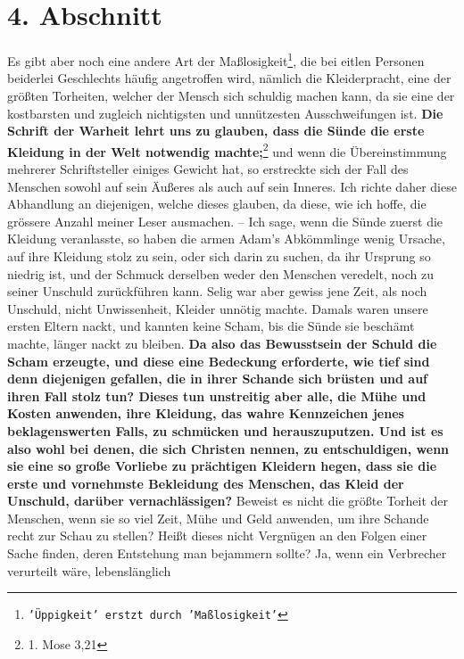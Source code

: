 \section{4. Abschnitt} \label{kap14_ab4}

Es gibt aber noch eine andere Art der Maßlosigkeit\footnote{\texttt{'Üppigkeit'
erstzt
durch 'Maßlosigkeit'}}, die bei eitlen Personen beiderlei
Geschlechts häufig angetroffen wird, nämlich die Kleiderpracht,
eine der
größten Torheiten, welcher der Mensch sich schuldig machen kann, da sie eine
der kostbarsten und zugleich nichtigsten und unnützesten Ausschweifungen ist.
\textbf{Die
Schrift der Warheit lehrt uns zu glauben, dass die Sünde die erste Kleidung in
der
Welt notwendig machte;}\footnote{1. Mose 3,21}
und wenn die Übereinstimmung
mehrerer Schriftsteller einiges Gewicht hat, so erstreckte sich der Fall des
Menschen sowohl auf sein Äußeres als auch auf sein Inneres. Ich richte daher
diese
Abhandlung an diejenigen, welche dieses glauben, da diese, wie ich hoffe, die
grössere Anzahl meiner Leser ausmachen. -- Ich sage, wenn die Sünde zuerst die
Kleidung veranlasste, so haben die armen Adam’s
Abkömmlinge wenig Ursache, auf
ihre Kleidung stolz zu sein, oder sich darin zu suchen, da ihr Ursprung so
niedrig ist, und der Schmuck derselben weder den Menschen veredelt, noch zu
seiner Unschuld zurückführen kann. Selig war aber gewiss jene Zeit, als noch
Unschuld, nicht Unwissenheit, Kleider unnötig machte. Damals waren unsere ersten
Eltern nackt, und kannten keine Scham, bis die Sünde sie beschämt
machte,
länger nackt zu bleiben. \label{ref:14_04_wahre_nachfolger_kleidung}
\textbf{Da also das Bewusstsein der Schuld die Scham erzeugte,
und diese eine Bedeckung erforderte, wie tief sind denn diejenigen gefallen, die
in ihrer Schande sich brüsten und auf ihren Fall stolz tun? Dieses tun
unstreitig aber alle, die Mühe und Kosten anwenden, ihre Kleidung, das wahre
Kennzeichen jenes beklagenswerten Falls, zu schmücken und herauszuputzen. Und
ist es also wohl bei denen, die sich Christen nennen, zu entschuldigen, wenn sie
eine so große Vorliebe zu prächtigen Kleidern hegen, dass sie die erste und
vornehmste Bekleidung des Menschen, das Kleid der Unschuld, darüber
vernachlässigen?} Beweist es nicht die größte Torheit der Menschen, wenn sie so
viel Zeit, Mühe und Geld anwenden, um ihre Schande recht zur Schau zu stellen?
Heißt dieses nicht Vergnügen an den Folgen einer Sache finden, deren Entstehung
man bejammern sollte? Ja, wenn ein Verbrecher verurteilt wäre, lebenslänglich
